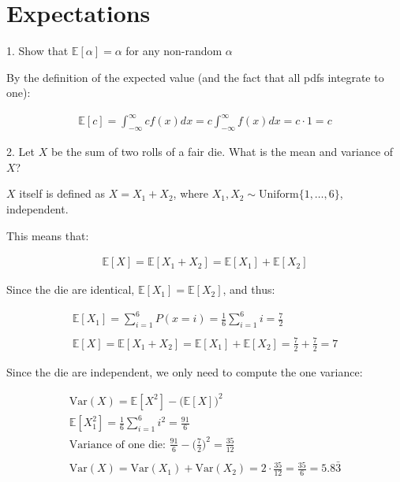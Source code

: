 \documentclass[10pt]{article}
\begin{document}
\newpage

\section{Expectations}

1. Show that $\mathbb{E}[\alpha] = \alpha$ for any non-random $\alpha$

By the definition of the expected value (and the fact that all pdfs integrate to one):

\begin{gather*}
    \mathbb{E}[c] = \int_{-\infty}^{\infty}cf(x) dx = c \int_{-\infty}^{\infty}f(x) dx = c \cdot 1 = c
\end{gather*}

\hfill

2. Let $X$ be the sum of two rolls of a fair die. What is the mean and variance of $X$?

$X$ itself is defined as $X = X_1 + X_2$, where $X_1, X_2 \sim \text{Uniform}\{1, …, 6\}$, independent.

This means that: 

\begin{gather*}
    \mathbb{E}[X] = \mathbb{E}[X_1 + X_2] = \mathbb{E}[X_1] + \mathbb{E}[X_2]
\end{gather*}

Since the die are identical, $\mathbb{E}[X_1] = \mathbb{E}[X_2]$, and thus:

\begin{gather*}
    \mathbb{E}[X_1] = \sum_{i = 1}^{6} P(x = i) = \frac{1}{6} \sum_{i = 1}^{6}i = \frac{7}{2} \\
    \\
    \mathbb{E}[X] = \mathbb{E}[X_1 + X_2] = \mathbb{E}[X_1] + \mathbb{E}[X_2] = \frac{7}{2} + \frac{7}{2} = 7
\end{gather*}

Since the die are independent, we only need to compute the one variance:

\begin{gather*}
    \text{Var}(X) = \mathbb{E}[X^2] - \big(\mathbb{E}[X]\big)^2 \\
    \mathbb{E}[X_1^2] = \frac{1}{6} \sum_{i = 1}^{6}i^2 = \frac{91}{6} \\
    \text{Variance of one die: }\frac{91}{6} - \Big(\frac{7}{2}\Big)^2 = \frac{35}{12}\\
    \\
    \text{Var}(X) = \text{Var}(X_1) + \text{Var}(X_2) = 2 \cdot \frac{35}{12} = \frac{35}{6} = 5.8\bar{3}
\end{gather*}
\end{document}
